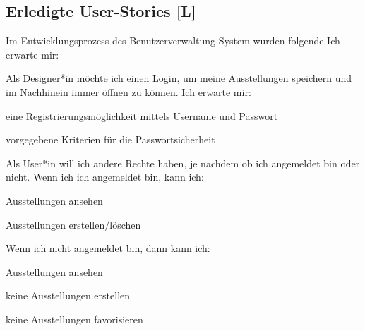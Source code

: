 \subsection{Erledigte User-Stories [L]}
Im Entwicklungsprozess des Benutzerverwaltung-System wurden folgende Ich erwarte mir: 
\begin{compactenum}
  \item Als Designer*in möchte ich einen Login, um meine Ausstellungen speichern und im Nachhinein immer öffnen zu können.
  Ich erwarte mir:
  \begin{compactitem}
    \item eine Registrierungsmöglichkeit mittels Username und Passwort
    \item vorgegebene Kriterien für die Passwortsicherheit
  \end{compactitem}

  \item Als User*in will ich andere Rechte haben, je nachdem ob ich angemeldet bin oder nicht. Wenn ich ich angemeldet bin, kann ich:
      \begin{compactitem}
          \item Ausstellungen ansehen
          \item Ausstellungen erstellen/löschen
      \end{compactitem}  
  Wenn ich nicht angemeldet bin, dann kann ich:
      \begin{compactitem}
          \item Ausstellungen ansehen
          \item keine Ausstellungen erstellen
          \item keine Ausstellungen favorisieren
      \end{compactitem} 
\end{compactenum}